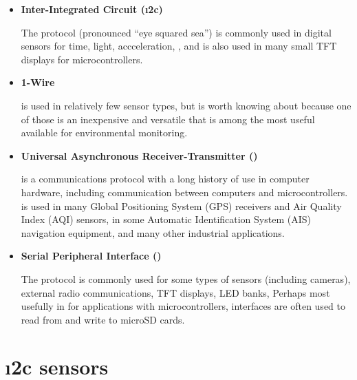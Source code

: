 \begin{itemize}
	\item \textbf{Inter-Integrated Circuit (\i2c)}

	The  protocol (pronounced ``eye squared sea'') is commonly used in digital sensors for time, light, accceleration, \etc, and is also used in many small TFT displays for microcontrollers.

	\item \textbf{1-Wire}

	  is used in relatively few sensor types, but is worth knowing about because one of those is an inexpensive and versatile  that is among the most useful available for environmental monitoring.


	\item \textbf{Universal Asynchronous Receiver-Transmitter (\uart)}

	 is a communications protocol with a long history of use in computer hardware, including communication between computers and microcontrollers.
	\uart is used in many Global Positioning System (GPS) receivers and Air Quality Index (AQI) sensors, in some Automatic Identification System (AIS) navigation equipment, and many other industrial applications.

	\item \textbf{Serial Peripheral Interface (\spi)}

	The  protocol is commonly used for some types of sensors (including cameras), external radio communications, TFT displays, LED banks, \etc
	Perhaps most usefully in for applications with microcontrollers, \spi interfaces are often used to read from and write to microSD cards.
\end{itemize}



\section{ \i2c sensors }

